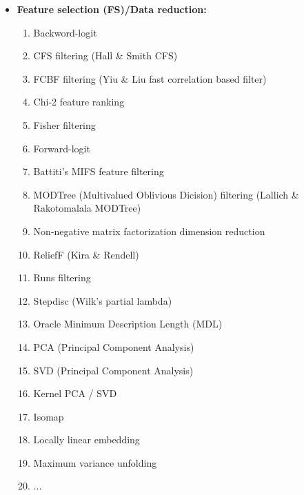 	\begin{itemize}
		\item \textbf{Feature selection (FS)/Data reduction:}
		\begin{multicols}{2}
		\begin{enumerate}
			\item Backword-logit
			\item CFS filtering (Hall \& Smith CFS)
			\item FCBF filtering (Yiu \& Liu fast correlation based filter)
			\item Chi-2 feature ranking
			\item Fisher filtering
			\item Forward-logit
			\item Battiti's MIFS feature filtering
			\item MODTree (Multivalued Oblivious Dicision) filtering (Lallich \& Rakotomalala MODTree)
			\item Non-negative matrix factorization dimension reduction
			\item ReliefF (Kira \& Rendell)
			\item Runs filtering
			\item Stepdisc (Wilk's partial lambda)
			\item Oracle Minimum Description Length (MDL)
			\item PCA (Principal Component Analysis)
			\item SVD (Principal Component Analysis)
			\item Kernel PCA / SVD
			\item Isomap
			\item Locally linear embedding
			\item Maximum variance unfolding
			\item ...
		\end{enumerate}
		\end{multicols}
		

\end{itemize}
